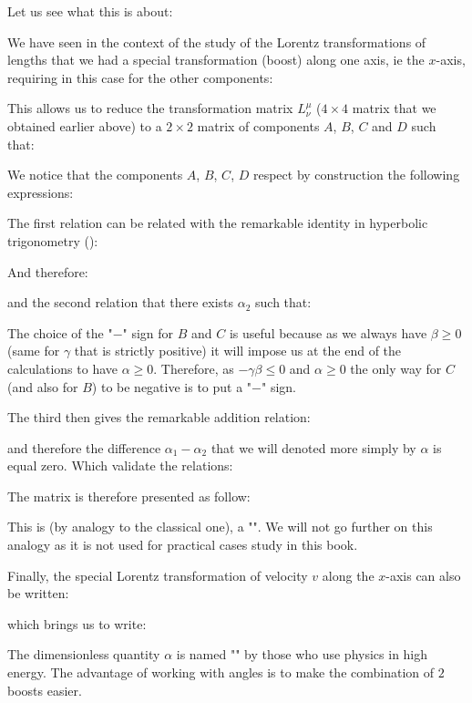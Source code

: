 	Let us see what this is about:
	
	We have seen in the context of the study of the Lorentz transformations of lengths that we had a special transformation (boost) along one axis, ie the $x$-axis, requiring in this case for the other components:
	
	This allows us to  reduce the transformation matrix $L_\nu^\mu$ ($4\times 4$ matrix that we obtained earlier above) to a $2\times 2$ matrix of components $A$, $B$, $C$ and $D$ such that:
	
	We notice that the components $A$, $B$, $C$, $D$ respect by construction the following expressions:
	
	The first relation can be related with the remarkable identity in hyperbolic trigonometry ():
	
	And therefore:
	
	and the second relation that there exists $\alpha_2$ such that:
	
	\begin{tcolorbox}[title=Remark,colframe=black,arc=10pt]
	The choice of the "$-$" sign for $B$ and $C$ is useful because as we always have $\beta \geq 0$ (same for $\gamma$ that is strictly positive) it will impose us at the end of the calculations to have $\alpha\geq 0$. Therefore, as $-\gamma\beta\leq 0$ and $\alpha\geq 0$ the only way for $C$ (and also for $B$) to be negative is to put a "$-$" sign.
	\end{tcolorbox}	
	The third then gives the remarkable addition relation:
	
	and therefore the difference $\alpha_1-\alpha_2$ that we will denoted more simply by $\alpha$ is equal zero. Which validate the relations:
	
	The matrix is therefore presented as follow:
	
	This is (by analogy to the classical one), a "". We will not go further on this analogy as it is not used for practical cases study in this book.
	
	Finally, the special Lorentz transformation of velocity $v$ along the $x$-axis can also be written:
	
	which brings us to write:
	
	The dimensionless quantity $\alpha$ is named "" by those who use physics in high energy. The advantage of working with angles is to make the combination of $2$ boosts easier.

